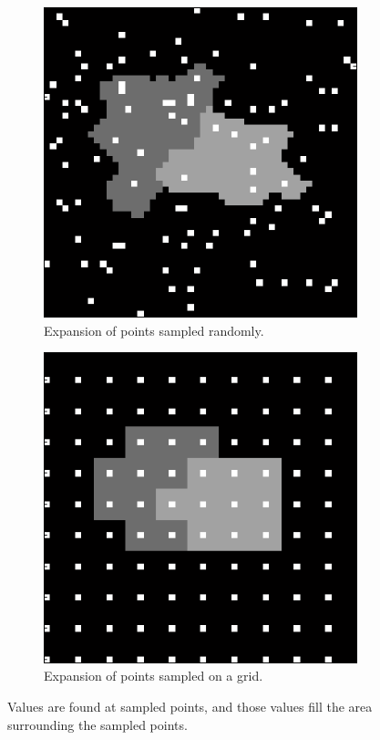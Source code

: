 \documentclass[english]{article}\usepackage[]{graphicx}\usepackage[]{color}
\begin{document}
\begin{figure}
\centering
\begin{subfigure}{.45\textwidth}
  \centering
    \includegraphics[width=1\linewidth]{figures/randompointexpansion}
  \caption{Expansion of points sampled randomly.}
  \label{fig:randexp}
\end{subfigure}%
\hspace{10pt}
\begin{subfigure}{.45\textwidth}
  \centering
    \includegraphics[width=1\linewidth]{figures/gridpointexpansion}
  \caption{Expansion of points sampled on a grid.}
  \label{fig:gridexp}
\end{subfigure}
\caption{Values are found at sampled points, and those values fill the area surrounding the sampled points.}
\label{fig:sampleexp}
\end{figure}
\end{document}
